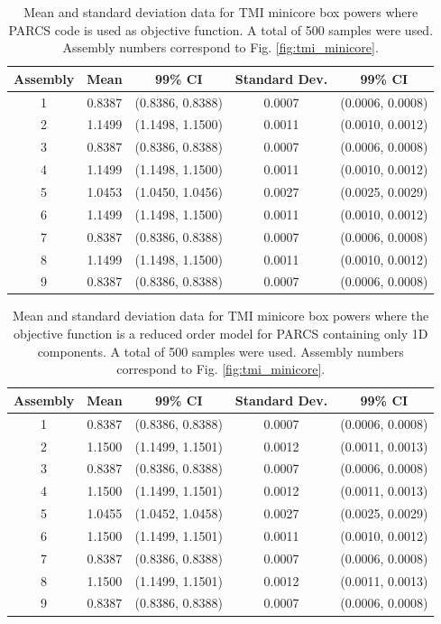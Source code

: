 \begin{table}[!htb] 
\caption{\label{table:tmi_mean_sd_mc} 
Mean and standard deviation data for \ac{TMI} minicore box powers where \ac{PARCS} code is used as objective function. A total of 500 samples were used. Assembly numbers correspond to Fig. \ref{fig:tmi_minicore}.}
\centering
\begin{tabular}{||c|c|c|c|c||} 
\hline \hline
\textbf{Assembly} & \textbf{Mean} & \textbf{99\% CI} & \textbf{Standard Dev.} & \textbf{99\% CI} \\ \hline
1 & 0.8387 & (0.8386, 0.8388) & 0.0007 & (0.0006, 0.0008) \\ \hline 
2 & 1.1499 & (1.1498, 1.1500) & 0.0011 & (0.0010, 0.0012) \\ \hline
3 & 0.8387 & (0.8386, 0.8388) & 0.0007 & (0.0006, 0.0008) \\ \hline
4 & 1.1499 & (1.1498, 1.1500) & 0.0011 & (0.0010, 0.0012) \\ \hline
5 & 1.0453 & (1.0450, 1.0456) & 0.0027 & (0.0025, 0.0029) \\ \hline
6 & 1.1499 & (1.1498, 1.1500) & 0.0011 & (0.0010, 0.0012) \\ \hline
7 & 0.8387 & (0.8386, 0.8388) & 0.0007 & (0.0006, 0.0008) \\ \hline
8 & 1.1499 & (1.1498, 1.1500) & 0.0011 & (0.0010, 0.0012) \\ \hline
9 & 0.8387 & (0.8386, 0.8388) & 0.0007 & (0.0006, 0.0008) \\ 
\hline \hline
\end{tabular}
\end{table}

\begin{table}[!htb] 
\caption{\label{table:tmi_mean_sd_1d} 
Mean and standard deviation data for \ac{TMI} minicore box powers where the objective function is a reduced order model for \ac{PARCS} containing only 1D components. A total of 500 samples were used. Assembly numbers correspond to Fig. \ref{fig:tmi_minicore}.}
\centering
\begin{tabular}{||c|c|c|c|c||} 
\hline \hline
\textbf{Assembly} & \textbf{Mean} & \textbf{99\% CI} & \textbf{Standard Dev.} & \textbf{99\% CI} \\ \hline
1 & 0.8387 & (0.8386, 0.8388) & 0.0007 & (0.0006, 0.0008) \\ \hline 
2 & 1.1500 & (1.1499, 1.1501) & 0.0012 & (0.0011, 0.0013) \\ \hline
3 & 0.8387 & (0.8386, 0.8388) & 0.0007 & (0.0006, 0.0008) \\ \hline
4 & 1.1500 & (1.1499, 1.1501) & 0.0012 & (0.0011, 0.0013) \\ \hline
5 & 1.0455 & (1.0452, 1.0458) & 0.0027 & (0.0025, 0.0029) \\ \hline
6 & 1.1500 & (1.1499, 1.1501) & 0.0011 & (0.0010, 0.0012) \\ \hline
7 & 0.8387 & (0.8386, 0.8388) & 0.0007 & (0.0006, 0.0008) \\ \hline
8 & 1.1500 & (1.1499, 1.1501) & 0.0012 & (0.0011, 0.0013) \\ \hline
9 & 0.8387 & (0.8386, 0.8388) & 0.0007 & (0.0006, 0.0008) \\
\hline \hline
\end{tabular}
\end{table}